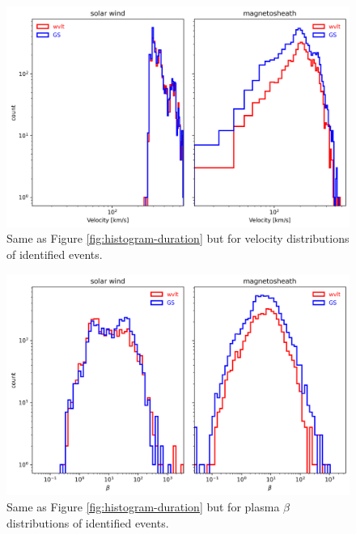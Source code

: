 \begin{figure}
    \centering
    \includegraphics[width=\textwidth]{Figures/Histograms/histogram_velocity.png}
    \caption[Histograms of velocity for identified events]{Same as Figure \ref{fig:histogram-duration} but for velocity distributions of identified events.}
    \label{fig:histogram-velocity}
\end{figure}

\begin{figure}
    \centering
    \includegraphics[width=\textwidth]{Figures/Histograms/histogram_logspace_beta.png}
    \caption[Histograms of beta for identified events]{Same as Figure \ref{fig:histogram-duration} but for plasma $\beta$ distributions of identified events.}
    \label{fig:histogram-beta}
\end{figure}

